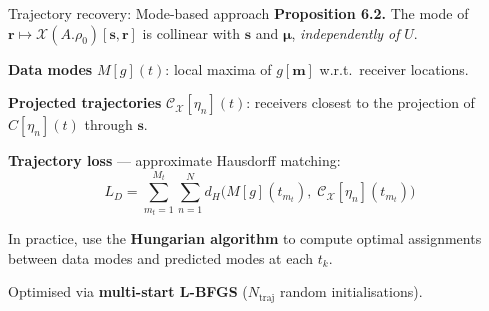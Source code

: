 \documentclass{beamer}
\begin{document}
    \begin{frame}{Trajectory recovery: Mode-based approach}
        \textbf{Proposition 6.2.} The mode of $\mathbf{r} \mapsto \mathcal{X}(A.\rho_0)[\mathbf{s}, \mathbf{r}]$ is collinear with $\mathbf{s}$ and $\boldsymbol{\mu}$, \emph{independently of} $U$.

        \vspace{0.3em}
        \pause
        \textbf{Data modes} $M[g](t)$: local maxima of $g[\mathbf{m}]$ w.r.t.\ receiver locations.

        \textbf{Projected trajectories} $\mathcal{C}_{\mathcal{X}}[\eta_n](t)$: receivers closest to the projection of $C[\eta_n](t)$ through $\mathbf{s}$.

        \vspace{0.3em}
        \textbf{Trajectory loss} --- approximate Hausdorff matching:
        $$
            L_D = \sum_{m_t=1}^{M_t} \sum_{n=1}^{N} d_H\bigl(M[g](t_{m_t}),\; \mathcal{C}_{\mathcal{X}}[\eta_n](t_{m_t})\bigr)
        $$

        \vspace{0.3em}
        \pause

        In practice, use the \textbf{Hungarian algorithm} to compute optimal assignments between data modes and predicted modes at each $t_k$.

        \vspace{0.3em}
        Optimised via \textbf{multi-start L-BFGS} ($N_{\mathrm{traj}}$ random initialisations).

    \end{frame}
\end{document}
